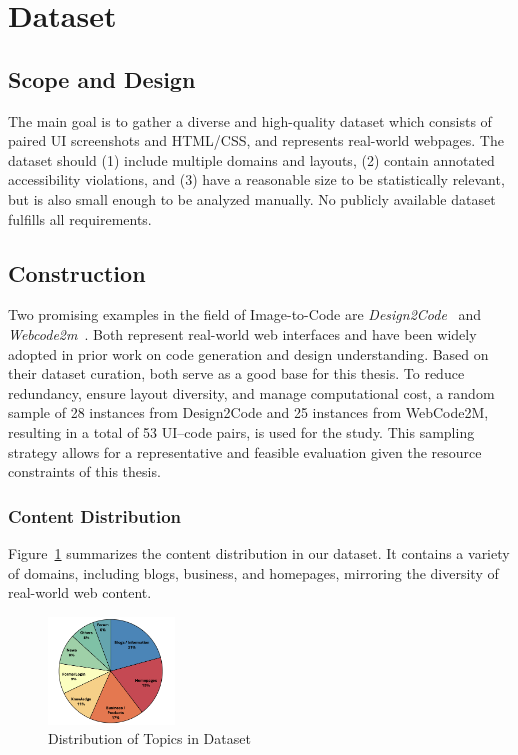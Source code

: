 \begingroup
    
\endgroup
\newpage

\section{Dataset}
\label{subchapter:Dataset}
\subsection{Scope and Design}
The main goal is to gather a diverse and high-quality dataset which consists of 
paired UI screenshots and HTML/CSS, and represents
real-world webpages. The dataset should (1) include multiple domains and layouts,
(2) contain annotated accessibility violations, and (3) have a reasonable size to be
statistically relevant, but is also small enough to be analyzed manually.
No publicly available dataset fulfills all requirements.

\subsection{Construction}
Two promising examples in the field of Image-to-Code are \textit{Design2Code}~\parencite{si2024design2code} 
and \textit{Webcode2m}~\parencite{gui2024webcode2m}. 
Both represent real-world web
interfaces and have been widely adopted in prior work on code generation 
and design understanding. Based on their
dataset curation, both serve as a good base for this thesis.\newline
To reduce redundancy, ensure layout diversity, and manage computational cost, a random sample of
28 instances from Design2Code and 25 instances from WebCode2M, resulting in a total of 53 UI–code
pairs, is used for the study. This sampling strategy allows for a representative and feasible evaluation
given the resource constraints of this thesis.


\subsubsection{Content Distribution}
Figure~\ref{fig:dataset_distribution} summarizes the content distribution in our dataset.
It contains a variety of domains, including blogs, business, and homepages, mirroring the 
diversity of real-world web content.

\begin{figure}[htbp]
  \centering
  \includegraphics[width=0.3\textwidth]{figures/dataset_distribution.png}
  \caption{Distribution of Topics in Dataset}
  \label{fig:dataset_distribution}
\end{figure}


